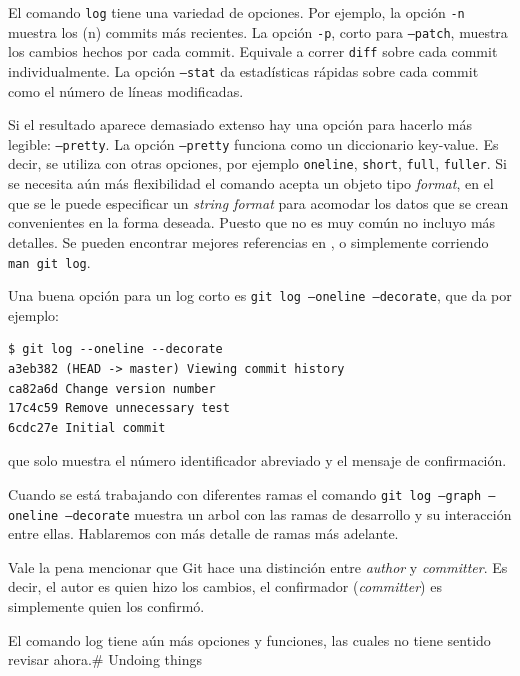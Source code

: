 \documentclass[spanish, 12pt, a4paper]{article}
\begin{document}
El comando \passthrough{\lstinline!log!} tiene una variedad de opciones.
Por ejemplo, la opción \passthrough{\lstinline!-n!} muestra los (n)
commits más recientes. La opción \passthrough{\lstinline!-p!}, corto
para \passthrough{\lstinline!–patch!}, muestra los cambios hechos por
cada commit. Equivale a correr \passthrough{\lstinline!diff!} sobre cada
commit individualmente. La opción \passthrough{\lstinline!–stat!} da
estadísticas rápidas sobre cada commit como el número de líneas
modificadas.

Si el resultado aparece demasiado extenso hay una opción para hacerlo
más legible: \passthrough{\lstinline!–pretty!}. La opción
\passthrough{\lstinline!–pretty!} funciona como un diccionario
key-value. Es decir, se utiliza con otras opciones, por ejemplo
\passthrough{\lstinline!oneline!}, \passthrough{\lstinline!short!},
\passthrough{\lstinline!full!}, \passthrough{\lstinline!fuller!}. Si se
necesita aún más flexibilidad el comando acepta un objeto tipo
\emph{format}, en el que se le puede especificar un \emph{string format}
para acomodar los datos que se crean convenientes en la forma deseada.
Puesto que no es muy común no incluyo más detalles. Se pueden encontrar
mejores referencias en , o simplemente corriendo
\passthrough{\lstinline!man git log!}.

Una buena opción para un log corto es
\passthrough{\lstinline!git log –oneline –decorate!}, que da por
ejemplo:

\begin{lstlisting}
$ git log --oneline --decorate
a3eb382 (HEAD -> master) Viewing commit history
ca82a6d Change version number
17c4c59 Remove unnecessary test
6cdc27e Initial commit
\end{lstlisting}

que solo muestra el número identificador abreviado y el mensaje de
confirmación.

Cuando se está trabajando con diferentes ramas el comando
\passthrough{\lstinline!git log –graph –oneline –decorate!} muestra un
arbol con las ramas de desarrollo y su interacción entre ellas.
Hablaremos con más detalle de ramas más adelante.

Vale la pena mencionar que Git hace una distinción entre \emph{author} y
\emph{committer}. Es decir, el autor es quien hizo los cambios, el
confirmador (\emph{committer}) es simplemente quien los confirmó.

El comando log tiene aún más opciones y funciones, las cuales no tiene
sentido revisar ahora.\# Undoing things
\end{document}
